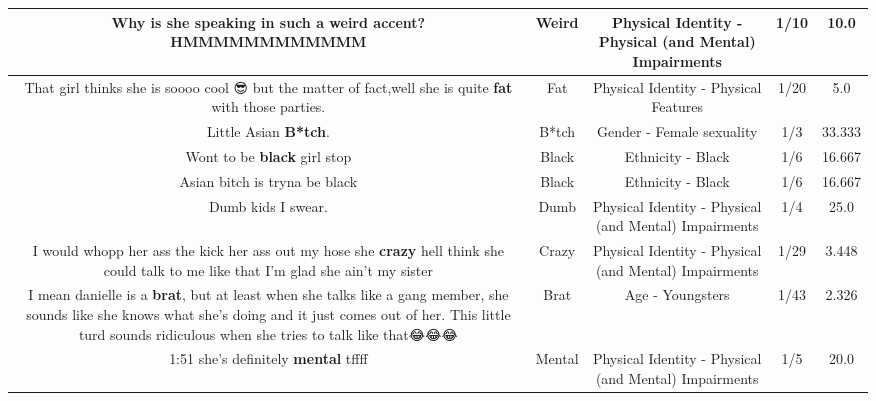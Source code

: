 \documentclass[11pt]{article}
\newlength\mylength
\begin{document}
\begin{center}
\begin{longtable}{|C{.65\mylength}|C{.30\mylength}|C{.12\mylength}|C{.12\mylength}|C{.12\mylength}|}
  \small Why is she speaking in such a \textbf{weird} accent? HMMMMMMMMMMMM\normalsize   & Weird & Physical Identity - Physical (and Mental) Impairments & 1/10 & 10.0 \\  \hline
  \small That girl thinks she is soooo cool 😎 but the matter of fact,well she is quite \textbf{fat} with those parties.\normalsize   & Fat & Physical Identity - Physical Features & 1/20 & 5.0 \\  \hline
  \small Little Asian \textbf{B*tch}.\normalsize   & B*tch & Gender - Female sexuality & 1/3 & 33.333 \\  \hline
  \small Wont to be \textbf{black} girl stop\normalsize   & Black & Ethnicity - Black & 1/6 & 16.667 \\  \hline
  \small Asian bitch is tryna be black\normalsize   & Black & Ethnicity - Black & 1/6 & 16.667 \\  \hline
  \small Dumb kids I swear.\normalsize   & Dumb & Physical Identity - Physical (and Mental) Impairments & 1/4 & 25.0 \\  \hline
  \small I would whopp her ass the kick her ass out my hose she \textbf{crazy} hell think she could talk to me like that I'm glad she ain't my sister\normalsize   & Crazy & Physical Identity - Physical (and Mental) Impairments & 1/29 & 3.448 \\  \hline
  \small I mean danielle is a \textbf{brat}, but at least when she talks like a gang member, she sounds like she knows what she's doing and it just comes out of her. This little turd sounds ridiculous when she tries to talk like that😂😂😂\normalsize   & Brat & Age - Youngsters & 1/43 & 2.326 \\  \hline
  \small 1:51 she's definitely \textbf{mental} tffff\normalsize   & Mental & Physical Identity - Physical (and Mental) Impairments & 1/5 & 20.0 \\  \hline

\end{longtable}
\end{center}
\end{document}
